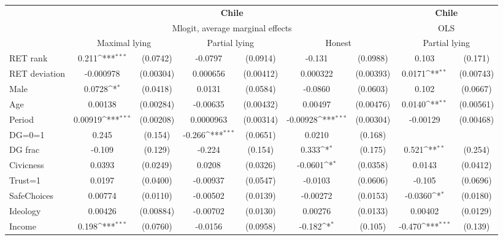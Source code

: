 \def\sym#1{\ifmmode^{#1}\else\(^{#1}\)\fi}
\begin{tabular}{l|cccccc|cc}
\hline\hline
&\multicolumn{6}{c|}{\bf Chile}&\multicolumn{2}{c}{\bf Chile}\\ &\multicolumn{6}{c|}{Mlogit, average marginal effects }&\multicolumn{2}{c}{OLS}\\
                &\multicolumn{2}{c}{Maximal lying}&\multicolumn{2}{c}{Partial lying}&\multicolumn{2}{c}{Honest}  &\multicolumn{2}{c}{Partial lying}\\
\hline
RET rank        &    0.211\sym{***}& (0.0742)&  -0.0797         & (0.0914)&   -0.131         & (0.0988)&    0.103         &  (0.171)\\
RET deviation   &-0.000978         &(0.00304)& 0.000656         &(0.00412)& 0.000322         &(0.00393)&   0.0171\sym{**} &(0.00743)\\
Male            &   0.0728\sym{*}  & (0.0418)&   0.0131         & (0.0584)&  -0.0860         & (0.0603)&    0.102         & (0.0667)\\
Age             &  0.00138         &(0.00284)& -0.00635         &(0.00432)&  0.00497         &(0.00476)&   0.0140\sym{**} &(0.00561)\\
Period          &  0.00919\sym{***}&(0.00208)&0.0000963         &(0.00314)& -0.00928\sym{***}&(0.00304)& -0.00129         &(0.00468)\\
DG=0=1          &    0.245         &  (0.154)&   -0.266\sym{***}& (0.0651)&   0.0210         &  (0.168)&                  &         \\
DG frac         &   -0.109         &  (0.129)&   -0.224         &  (0.154)&    0.333\sym{*}  &  (0.175)&    0.521\sym{**} &  (0.254)\\
Civicness       &   0.0393         & (0.0249)&   0.0208         & (0.0326)&  -0.0601\sym{*}  & (0.0358)&   0.0143         & (0.0412)\\
Trust=1         &   0.0197         & (0.0400)& -0.00937         & (0.0547)&  -0.0103         & (0.0606)&   -0.105         & (0.0696)\\
SafeChoices     &  0.00774         & (0.0110)& -0.00502         & (0.0139)& -0.00272         & (0.0153)&  -0.0360\sym{*}  & (0.0180)\\
Ideology        &  0.00426         &(0.00884)& -0.00702         & (0.0130)&  0.00276         & (0.0133)&  0.00402         & (0.0129)\\
Income          &    0.198\sym{***}& (0.0760)&  -0.0156         & (0.0958)&   -0.182\sym{*}  &  (0.105)&   -0.470\sym{***}&  (0.139)\\

\end{tabular}
